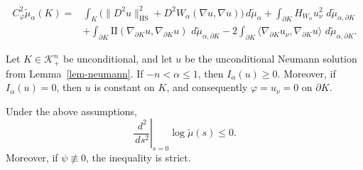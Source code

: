 \documentclass[10pt,a4paper]{amsart}
\newcommand{\HS}{\mathrm{HS}}
\newcommand{\dd}{\,d}
\begin{document}
  \begin{equation}\label{eq-reilly-final}
    \begin{aligned}
      C_\varphi^2\tilde{\mu}_\alpha(K)
      =&\int_K\bigl(\|D^2u\|_{\HS}^2
         +D^2W_\alpha(\nabla u,\nabla u)\bigr)
         \dd\tilde{\mu}_\alpha
       +\int_{\partial K}H_{W_\alpha}u_\nu^2
         \,\dd\tilde{\mu}_{\alpha,\partial K}\\
       &+\int_{\partial K}\mathrm{II}(\nabla_{\partial K}u,
         \nabla_{\partial K}u)
         \,\dd\tilde{\mu}_{\alpha,\partial K}
       -2\int_{\partial K}
         \langle\nabla_{\partial K}u_\nu,
         \nabla_{\partial K}u\rangle
         \,\dd\tilde{\mu}_{\alpha,\partial K}.
    \end{aligned}
  \end{equation}

\begin{prop}\label{prop-energy}
  Let $K\in\mathcal{K}_{+}^n$ be unconditional, and let $u$ be
  the unconditional Neumann solution from Lemma~\ref{lem-neumann}. If
  $-n<\alpha\le1$, then $I_\alpha(u)\ge0$.
  Moreover, if $I_\alpha(u)=0$, then $u$ is constant on $K$, and
  consequently $\varphi = u_\nu = 0$ on $\partial K$.
\end{prop}

\begin{prop}\label{prop-local-logconcave-strict} 
  Under the above assumptions,
  \[
    \left.\frac{\dd^2}{\dd s^2}\right|_{s=0}
    \log \tilde{\mu}(s)\le 0 .
  \]
  Moreover, if $\psi\not\equiv 0$, the inequality is strict.
\end{prop}
\end{document}
